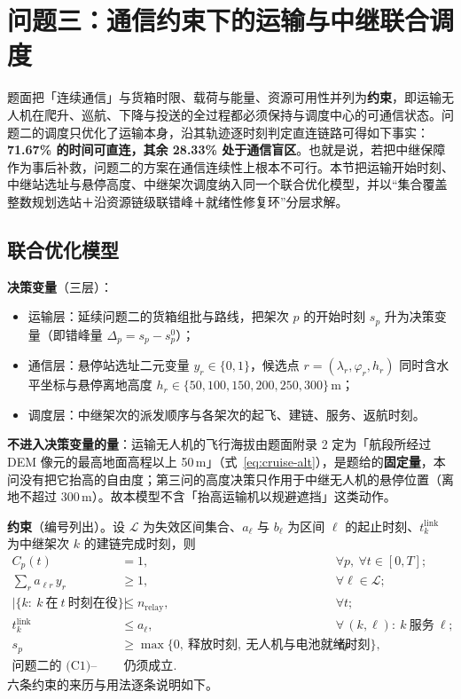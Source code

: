 \section{问题三：通信约束下的运输与中继联合调度}

题面把「连续通信」与货箱时限、载荷与能量、资源可用性并列为\textbf{约束}，即运输无人机在爬升、巡航、下降与投送的全过程都必须保持与调度中心的可通信状态。问题二的调度只优化了运输本身，沿其轨迹逐时刻判定直连链路可得如下事实：\textbf{71.67\% 的时间可直连，其余 28.33\% 处于通信盲区}。也就是说，若把中继保障作为事后补救，问题二的方案在通信连续性上根本不可行。本节把运输开始时刻、中继站选址与悬停高度、中继架次调度纳入同一个联合优化模型，并以“集合覆盖整数规划选站＋沿资源链级联错峰＋就绪性修复环”分层求解。

\subsection{联合优化模型}

\textbf{决策变量}（三层）：
\begin{itemize}
	\item 运输层：延续问题二的货箱组批与路线，把架次 $p$ 的开始时刻 $s_p$ 升为决策变量（即错峰量 $\Delta_p=s_p-s_p^{0}$）；
	\item 通信层：悬停站选址二元变量 $y_r\in\{0,1\}$，候选点 $r=(\lambda_r,\varphi_r,h_r)$ 同时含水平坐标与悬停离地高度 $h_r\in\{50,100,150,200,250,300\}$\,m；
	\item 调度层：中继架次的派发顺序与各架次的起飞、建链、服务、返航时刻。
\end{itemize}

\textbf{不进入决策变量的量}：运输无人机的飞行海拔由题面附录 2 定为「航段所经过 DEM 像元的最高地面高程以上 50\,m」（式~\eqref{eq:cruise-alt}），是题给的\textbf{固定量}，本问没有把它抬高的自由度；第三问的高度决策只作用于中继无人机的悬停位置（离地不超过 300\,m）。故本模型不含「抬高运输机以规避遮挡」这类动作。

\textbf{约束}（编号列出）。设 $\mathcal{L}$ 为失效区间集合、$a_\ell$ 与 $b_\ell$ 为区间 $\ell$ 的起止时刻、$t^{\mathrm{link}}_k$ 为中继架次 $k$ 的建链完成时刻，则
\begin{subequations}
	\label{eq:q3-cons}
	\begin{align}
		C_p(t) &= 1, && \forall p,\ \forall t\in[0,T]; \tag{C1}\label{eq:q3-c1}\\
		\sum_{r} a_{\ell r}\,y_r &\ge 1, && \forall \ell\in\mathcal{L}; \tag{C2}\label{eq:q3-c2}\\
		\bigl|\{k:\ k\ \text{在}\ t\ \text{时刻在役}\}\bigr| &\le n_{\mathrm{relay}}, && \forall t; \tag{C3}\label{eq:q3-c3}\\
		t^{\mathrm{link}}_{k} &\le a_{\ell}, && \forall\,(k,\ell):\ k\ \text{服务}\ \ell; \tag{C4}\label{eq:q3-c4}\\
		s_p &\ge \max\bigl\{0,\ \text{释放时刻},\ \text{无人机与电池就绪时刻}\bigr\}, && \forall p; \tag{C5}\label{eq:q3-c5}\\
		\text{问题二的 (C1)--(C6)} &\ \text{仍须成立}. && \tag{C6}\label{eq:q3-c6}
	\end{align}
\end{subequations}
六条约束的来历与用法逐条说明如下。

